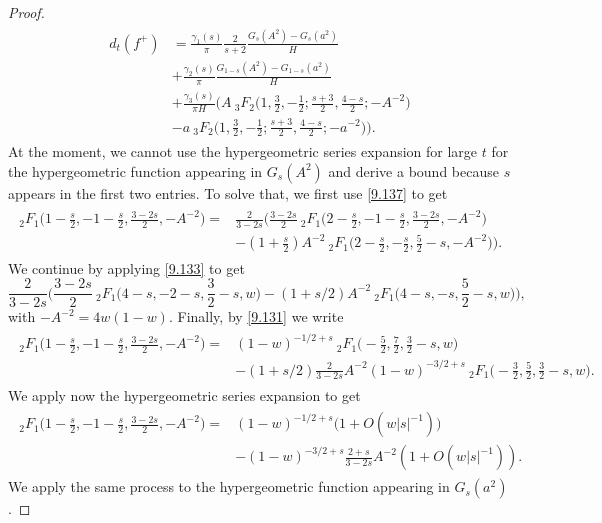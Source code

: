 \documentclass[a4paper,11pt]{amsart}
\theoremstyle{definition}
\begin{document}
\begin{proof}
\begin{align}
    \begin{split} \label{4sum}
         d_t(f^{+})&=\frac{\gamma_1(s)}{\pi}\frac{2}{s+2}\frac{G_s(A^2)-G_s(a^2)}{H} \\
         &+\frac{\gamma_2(s)}{\pi}\frac{G_{1-s}(A^2)-G_{1-s}(a^2)}{H}\\
         &+\frac{\gamma_3(s)}{\pi H}\Bigg(A\: _3F_2\Big(1,\frac{3}{2},-\frac{1}{2};\frac{s+3}{2},\frac{4-s}{2};-A^{-2}\Big)\\
        &-a\: _3F_2\Big(1,\frac{3}{2},-\frac{1}{2};\frac{s+3}{2},\frac{4-s}{2};-a^{-2}\Big)\Bigg).
    \end{split}
\end{align}
At the moment, we cannot use the hypergeometric series expansion for large $t$ for the hypergeometric function appearing in $G_s(A^2)$ and derive a bound because $s$ appears in the first two entries. To solve that, we first use \eqref{9.137} to get
\begin{align}
    \begin{split}
        _2F_1\Big(1-\frac{s}{2},-1-\frac{s}{2},\frac{3-2s}{2},-A^{-2}\Big)=&\frac{2}{3-2s}\Big(\frac{3-2s}{2}\: _2F_1\Big(2-\frac{s}{2},-1-\frac{s}{2},\frac{3-2s}{2},-A^{-2}\Big)\\
    &-(1+\frac{s}{2})A^{-2}\:_2F_1\Big(2-\frac{s}{2},-\frac{s}{2},\frac{5}{2}-s,-A^{-2}\Big)\Big).
    \end{split}  
\end{align}
We continue by applying \eqref{9.133}
to get
\begin{equation}
    \frac{2}{3-2s}\Big(\frac{3-2s}{2}\:_2F_1\Big(4-s,-2-s,\frac{3}{2}-s,w\Big)-(1+s/2)A^{-2}\:_2F_1\Big(4-s,-s,\frac{5}{2}-s,w\Big)\Big),
\end{equation}
with $-A^{-2}=4w(1-w)$. Finally, by \eqref{9.131} we write
\begin{align}
\begin{split}
    _2F_1\Big(1-\frac{s}{2},-1-\frac{s}{2},\frac{3-2s}{2},-A^{-2}\Big)=&(1-w)^{-1/2+s}\:_2F_1\Big(-\frac{5}{2},\frac{7}{2},\frac{3}{2}-s,w\Big)\\
    &-(1+s/2)\frac{2}{3-2s}A^{-2}(1-w)^{-3/2+s}\:_2F_1\Big(-\frac{3}{2},\frac{5}{2},\frac{3}{2}-s,w\Big).
\end{split}   
\end{align}
We apply now the hypergeometric series expansion to get
\begin{align}
\begin{split}
    _2F_1\Big(1-\frac{s}{2},-1-\frac{s}{2},\frac{3-2s}{2},-A^{-2}\Big)=&(1-w)^{-1/2+s}\big(1+O(w|s|^{-1}))\\
    &-(1-w)^{-3/2+s}\frac{2+s}{3-2s}A^{-2}(1+O(w|s|^{-1})).
\end{split}
\end{align}
We apply the same process to the hypergeometric function appearing in $G_s(a^2)$.


\end{proof}
\end{document}
